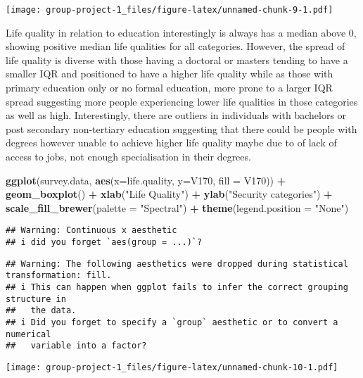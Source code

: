 \documentclass[
]{article}
\newenvironment{Shaded}{\begin{snugshade}}{\end{snugshade}}
\newcommand{\AttributeTok}[1]{\textcolor[rgb]{0.13,0.29,0.53}{#1}}
\newcommand{\FunctionTok}[1]{\textcolor[rgb]{0.13,0.29,0.53}{\textbf{#1}}}
\newcommand{\NormalTok}[1]{#1}
\newcommand{\SpecialCharTok}[1]{\textcolor[rgb]{0.81,0.36,0.00}{\textbf{#1}}}
\newcommand{\StringTok}[1]{\textcolor[rgb]{0.31,0.60,0.02}{#1}}
\begin{document}
\texttt{[image: group-project-1\_files/figure-latex/unnamed-chunk-9-1.pdf]}

Life quality in relation to education interestingly is always has a
median above 0, showing positive median life qualities for all
categories. However, the spread of life quality is diverse with those
having a doctoral or masters tending to have a smaller IQR and
positioned to have a higher life quality while as those with primary
education only or no formal education, more prone to a larger IQR spread
suggesting more people experiencing lower life qualities in those
categories as well as high. Interestingly, there are outliers in
individuals with bachelors or post secondary non-tertiary education
suggesting that there could be people with degrees however unable to
achieve higher life quality maybe due to of lack of access to jobs, not
enough specialisation in their degrees.

\begin{Shaded}
\begin{Highlighting}[]
\FunctionTok{ggplot}\NormalTok{(survey.data, }\FunctionTok{aes}\NormalTok{(}\AttributeTok{x=}\NormalTok{life.quality, }\AttributeTok{y=}\NormalTok{V170, }\AttributeTok{fill =}\NormalTok{ V170)) }\SpecialCharTok{+} 
  \FunctionTok{geom\_boxplot}\NormalTok{() }\SpecialCharTok{+}
  \FunctionTok{xlab}\NormalTok{(}\StringTok{"Life Quality"}\NormalTok{) }\SpecialCharTok{+}
  \FunctionTok{ylab}\NormalTok{(}\StringTok{"Security categories"}\NormalTok{) }\SpecialCharTok{+}
  \FunctionTok{scale\_fill\_brewer}\NormalTok{(}\AttributeTok{palette =} \StringTok{"Spectral"}\NormalTok{) }\SpecialCharTok{+}
  \FunctionTok{theme}\NormalTok{(}\AttributeTok{legend.position =} \StringTok{"None"}\NormalTok{)}
\end{Highlighting}
\end{Shaded}

\begin{verbatim}
## Warning: Continuous x aesthetic
## i did you forget `aes(group = ...)`?
\end{verbatim}

\begin{verbatim}
## Warning: The following aesthetics were dropped during statistical transformation: fill.
## i This can happen when ggplot fails to infer the correct grouping structure in
##   the data.
## i Did you forget to specify a `group` aesthetic or to convert a numerical
##   variable into a factor?
\end{verbatim}

\texttt{[image: group-project-1\_files/figure-latex/unnamed-chunk-10-1.pdf]}
\end{document}
